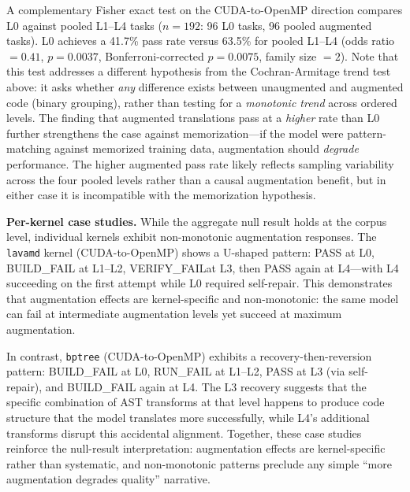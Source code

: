 \documentclass[conference]{IEEEtran}
\newcommand{\buildfail}{\textsc{BUILD\_FAIL}}
\newcommand{\runfail}{\textsc{RUN\_FAIL}}
\newcommand{\verifyfail}{\textsc{VERIFY\_FAIL}}
\begin{document}
A complementary Fisher exact test on the CUDA-to-OpenMP direction compares L0 against pooled L1--L4 tasks ($n = 192$: 96 L0 tasks, 96 pooled augmented tasks). L0 achieves a 41.7\% pass rate versus 63.5\% for pooled L1--L4 (odds ratio $= 0.41$, $p = 0.0037$, Bonferroni-corrected $p = 0.0075$, family size $= 2$). Note that this test addresses a different hypothesis from the Cochran-Armitage trend test above: it asks whether \emph{any} difference exists between unaugmented and augmented code (binary grouping), rather than testing for a \emph{monotonic trend} across ordered levels. The finding that augmented translations pass at a \emph{higher} rate than L0 further strengthens the case against memorization---if the model were pattern-matching against memorized training data, augmentation should \emph{degrade} performance. The higher augmented pass rate likely reflects sampling variability across the four pooled levels rather than a causal augmentation benefit, but in either case it is incompatible with the memorization hypothesis.

\textbf{Per-kernel case studies.} While the aggregate null result holds at the corpus level, individual kernels exhibit non-monotonic augmentation responses. The \texttt{lavamd} kernel (CUDA-to-OpenMP) shows a U-shaped pattern: PASS at L0, \buildfail{} at L1--L2, \verifyfail at L3, then PASS again at L4---with L4 succeeding on the first attempt while L0 required self-repair. This demonstrates that augmentation effects are kernel-specific and non-monotonic: the same model can fail at intermediate augmentation levels yet succeed at maximum augmentation.

In contrast, \texttt{bptree} (CUDA-to-OpenMP) exhibits a recovery-then-reversion pattern: \buildfail{} at L0, \runfail{} at L1--L2, PASS at L3 (via self-repair), and \buildfail{} again at L4. The L3 recovery suggests that the specific combination of AST transforms at that level happens to produce code structure that the model translates more successfully, while L4's additional transforms disrupt this accidental alignment. Together, these case studies reinforce the null-result interpretation: augmentation effects are kernel-specific rather than systematic, and non-monotonic patterns preclude any simple ``more augmentation degrades quality'' narrative.
\end{document}
